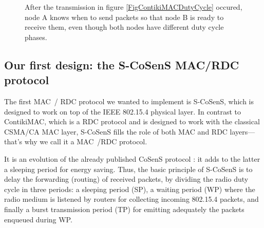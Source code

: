 \documentclass[a4paper,twoside]{article}
\begin{document}
\begin{figure}[!h]
\centering
{}
\caption{After the transmission in figure \ref{FigContikiMACDutyCycle}
occured, node A knows when to send packets so that node B is ready
to receive them, even though both nodes have different duty cycle phases.}
\label{FigContikiMACPhaseLock}
\end{figure}



\subsection{Our first design: the S-CoSenS MAC/RDC protocol}

The first MAC~/ RDC protocol we wanted to implement is S-CoSenS, which
is designed to work on top of the IEEE 802.15.4 physical layer. In contrast
to ContikiMAC, which is a RDC protocol and is designed to work with the
classical CSMA/CA MAC layer, S-CoSenS fills the role of both MAC and RDC
layers---that's why we call it a MAC~/RDC protocol.

It is an evolution of the already published CoSenS protocol \cite{CosensConf}:
it adds to the latter a sleeping period for energy saving.
Thus, the basic principle of S-CoSenS is to delay the forwarding (routing)
of received packets, by dividing the radio duty cycle in three periods:
a sleeping period (SP), a waiting period (WP) where the radio medium
is listened by routers for collecting incoming 802.15.4 packets, and
finally a burst transmission period (TP) for emitting adequately
the packets enqueued during WP.
\end{document}
